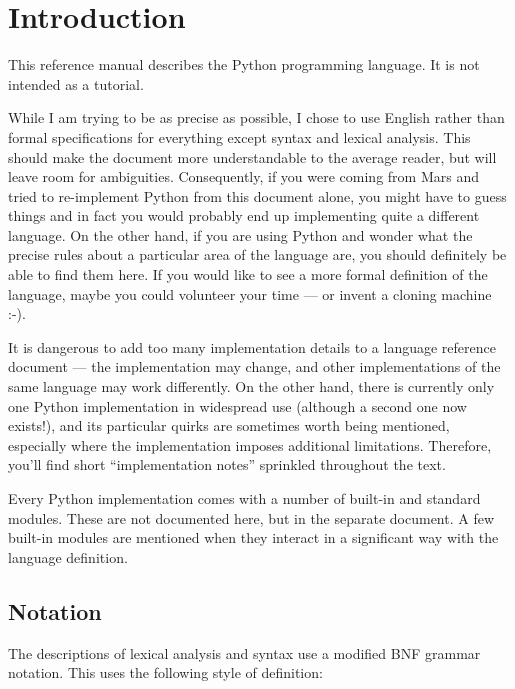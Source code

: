 \chapter{Introduction\label{introduction}}

This reference manual describes the Python programming language.
It is not intended as a tutorial.

While I am trying to be as precise as possible, I chose to use English
rather than formal specifications for everything except syntax and
lexical analysis.  This should make the document more understandable
to the average reader, but will leave room for ambiguities.
Consequently, if you were coming from Mars and tried to re-implement
Python from this document alone, you might have to guess things and in
fact you would probably end up implementing quite a different language.
On the other hand, if you are using
Python and wonder what the precise rules about a particular area of
the language are, you should definitely be able to find them here.
If you would like to see a more formal definition of the language,
maybe you could volunteer your time --- or invent a cloning machine
:-).

It is dangerous to add too many implementation details to a language
reference document --- the implementation may change, and other
implementations of the same language may work differently.  On the
other hand, there is currently only one Python implementation in
widespread use (although a second one now exists!), and
its particular quirks are sometimes worth being mentioned, especially
where the implementation imposes additional limitations.  Therefore,
you'll find short ``implementation notes'' sprinkled throughout the
text.

Every Python implementation comes with a number of built-in and
standard modules.  These are not documented here, but in the separate
 document.  A few
built-in modules are mentioned when they interact in a significant way
with the language definition.


\section{Notation\label{notation}}

The descriptions of lexical analysis and syntax use a modified BNF
grammar notation.  This uses the following style of definition:


